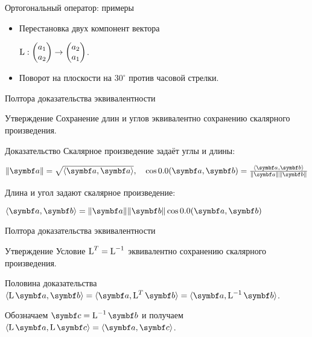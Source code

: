 \begin{frame}{Ортогональный оператор: примеры}


\begin{itemize}[<+->]
    \item Перестановка двух компонент вектора
    
    $\operatorname{L}: \begin{pmatrix}
        a_1 \\
        a_2
    \end{pmatrix} \to
    \begin{pmatrix}
        a_2 \\
        a_1
    \end{pmatrix}$.

    \item Поворот на плоскости на $30^{\circ}$ против часовой стрелки.

\end{itemize}

\end{frame}
    


\begin{frame}{Полтора доказательства эквивалентности}

\begin{block}{Утверждение}
Сохранение длин и углов эквивалентно сохранению скалярного произведения.
\end{block}
\pause


\begin{block}{Доказательство}
Скалярное произведение задаёт углы и длины:

$\norm{\ba} = \sqrt{\langle \ba, \ba\rangle}, \quad \cos\angle (\ba, \bb)= \frac{\langle \ba, \bb\rangle} {\norm{\ba} \norm{\bb}}$

\pause
Длина и угол задают скалярное произведение:

$\langle \ba, \bb \rangle = \norm{\ba} \norm{\bb} \cos \angle (\ba, \bb)$
\end{block}
\end{frame}

\begin{frame}{Полтора доказательства эквивалентности}



\begin{block}{Утверждение}
Условие $\operatorname{L}^T = \operatorname{L}^{-1}$ эквивалентно сохранению скалярного произведения.
\end{block}
\pause

\begin{block}{Половина доказательства}
$\langle \LL \ba, \bb \rangle = \langle \ba, \LL^T \bb \rangle= \langle \ba, \LL^{-1}\bb \rangle$.
\pause

Обозначаем $\bc = \LL^{-1} \bb$ и получаем $\langle \LL \ba, \LL \bc \rangle = \langle \ba, \bc \rangle$.
\end{block}


\end{frame}

